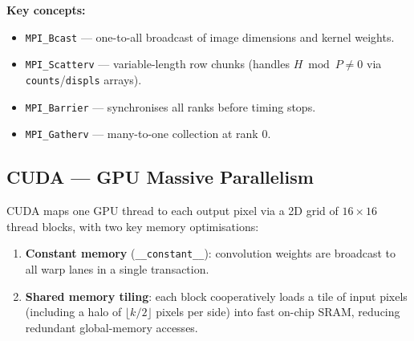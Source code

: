 \documentclass[12pt,a4paper]{article}
\begin{document}
\textbf{Key concepts:}
\begin{itemize}
  \item \texttt{MPI\_Bcast} --- one-to-all broadcast of image dimensions and
        kernel weights.
  \item \texttt{MPI\_Scatterv} --- variable-length row chunks (handles
        $H \bmod P \neq 0$ via \texttt{counts}/\texttt{displs} arrays).
  \item \texttt{MPI\_Barrier} --- synchronises all ranks before timing stops.
  \item \texttt{MPI\_Gatherv} --- many-to-one collection at rank 0.
\end{itemize}

\subsection{CUDA --- GPU Massive Parallelism}

CUDA maps one GPU thread to each output pixel via a 2D grid of
$16\!\times\!16$ thread blocks, with two key memory optimisations:

\begin{enumerate}
  \item \textbf{Constant memory} (\texttt{\_\_constant\_\_}): convolution
        weights are broadcast to all warp lanes in a single transaction.
  \item \textbf{Shared memory tiling}: each block cooperatively loads a tile of
        input pixels (including a halo of $\lfloor k/2\rfloor$ pixels per
        side) into fast on-chip SRAM, reducing redundant global-memory accesses.
\end{enumerate}
\end{document}
